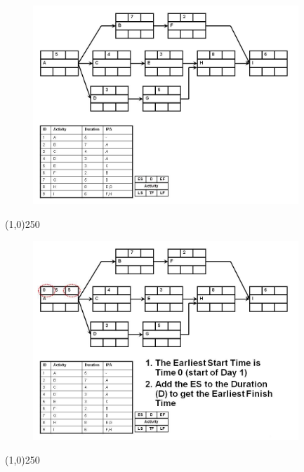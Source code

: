 \begin{frame}
\begin{figure}
	\centering
		\includegraphics[width = 10.0cm]{oldnotes/Slide140.jpg}
\end{figure}
\end{frame}
\begin{center}\line(1,0){250}\end{center}




\begin{frame}
\begin{figure}
	\centering
		\includegraphics[width = 10.0cm]{oldnotes/Slide141.jpg}
\end{figure}
\end{frame}
\begin{center}\line(1,0){250}\end{center}




